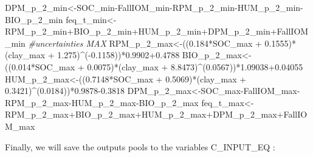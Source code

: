 \documentclass[
  10pt,
  b5paper,
]{book}
\newenvironment{Shaded}{\begin{snugshade}}{\end{snugshade}}
\newcommand{\CommentTok}[1]{\textcolor[rgb]{0.56,0.35,0.01}{\textit{#1}}}
\newcommand{\FloatTok}[1]{\textcolor[rgb]{0.00,0.00,0.81}{#1}}
\newcommand{\NormalTok}[1]{#1}
\newcommand{\OtherTok}[1]{\textcolor[rgb]{0.56,0.35,0.01}{#1}}
\newcommand{\SpecialCharTok}[1]{\textcolor[rgb]{0.00,0.00,0.00}{#1}}
\begin{document}
\begin{Shaded}
\begin{Highlighting}[]
\NormalTok{DPM\_p\_2\_min}\OtherTok{\textless{}{-}}\NormalTok{SOC\_min}\SpecialCharTok{{-}}\NormalTok{FallIOM\_min}\SpecialCharTok{{-}}\NormalTok{RPM\_p\_2\_min}\SpecialCharTok{{-}}\NormalTok{HUM\_p\_2\_min}\SpecialCharTok{{-}}\NormalTok{BIO\_p\_2\_min}
\NormalTok{feq\_t\_min}\OtherTok{\textless{}{-}}\NormalTok{RPM\_p\_2\_min}\SpecialCharTok{+}\NormalTok{BIO\_p\_2\_min}\SpecialCharTok{+}\NormalTok{HUM\_p\_2\_min}\SpecialCharTok{+}\NormalTok{DPM\_p\_2\_min}\SpecialCharTok{+}\NormalTok{FallIOM\_min}
\CommentTok{\#uncertainties  MAX}
\NormalTok{RPM\_p\_2\_max}\OtherTok{\textless{}{-}}\NormalTok{((}\FloatTok{0.184}\SpecialCharTok{*}\NormalTok{SOC\_max }\SpecialCharTok{+} \FloatTok{0.1555}\NormalTok{)}\SpecialCharTok{*}\NormalTok{(clay\_max }\SpecialCharTok{+} \FloatTok{1.275}\NormalTok{)}\SpecialCharTok{\^{}}\NormalTok{(}\SpecialCharTok{{-}}\FloatTok{0.1158}\NormalTok{))}\SpecialCharTok{*}\FloatTok{0.9902+0.4788}
\NormalTok{BIO\_p\_2\_max}\OtherTok{\textless{}{-}}\NormalTok{((}\FloatTok{0.014}\SpecialCharTok{*}\NormalTok{SOC\_max }\SpecialCharTok{+} \FloatTok{0.0075}\NormalTok{)}\SpecialCharTok{*}\NormalTok{(clay\_max }\SpecialCharTok{+} \FloatTok{8.8473}\NormalTok{)}\SpecialCharTok{\^{}}\NormalTok{(}\FloatTok{0.0567}\NormalTok{))}\SpecialCharTok{*}\FloatTok{1.09038+0.04055}
\NormalTok{HUM\_p\_2\_max}\OtherTok{\textless{}{-}}\NormalTok{((}\FloatTok{0.7148}\SpecialCharTok{*}\NormalTok{SOC\_max }\SpecialCharTok{+} \FloatTok{0.5069}\NormalTok{)}\SpecialCharTok{*}\NormalTok{(clay\_max }\SpecialCharTok{+} \FloatTok{0.3421}\NormalTok{)}\SpecialCharTok{\^{}}\NormalTok{(}\FloatTok{0.0184}\NormalTok{))}\SpecialCharTok{*}\FloatTok{0.9878{-}0.3818}
\NormalTok{DPM\_p\_2\_max}\OtherTok{\textless{}{-}}\NormalTok{SOC\_max}\SpecialCharTok{{-}}\NormalTok{FallIOM\_max}\SpecialCharTok{{-}}\NormalTok{RPM\_p\_2\_max}\SpecialCharTok{{-}}\NormalTok{HUM\_p\_2\_max}\SpecialCharTok{{-}}\NormalTok{BIO\_p\_2\_max}
\NormalTok{feq\_t\_max}\OtherTok{\textless{}{-}}\NormalTok{RPM\_p\_2\_max}\SpecialCharTok{+}\NormalTok{BIO\_p\_2\_max}\SpecialCharTok{+}\NormalTok{HUM\_p\_2\_max}\SpecialCharTok{+}\NormalTok{DPM\_p\_2\_max}\SpecialCharTok{+}\NormalTok{FallIOM\_max}
\end{Highlighting}
\end{Shaded}

Finally, we will save the outputs pools to the variables C\_INPUT\_EQ :
\end{document}
